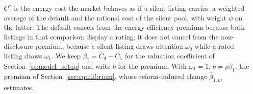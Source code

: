 $C^*$ is the energy cost the market behaves as if a silent listing carries: a weighted average of the default and the rational cost of the silent pool, with weight $\psi$ on the latter. The default cancels from the energy-efficiency premium because both listings in that comparison display a rating; it does not cancel from the non-disclosure premium, because a silent listing draws attention $\omega_0$ while a rated listing draws $\omega_1$. We keep $\beta_1=C_0-C_1$ for the valuation coefficient of Section~\ref{ss:model_setup} and write $b$ for the premium. With $\omega_1=1$, $b=\rho\beta_1$, the premium of Section~\ref{sec:equilibrium}, whose reform-induced change $\hat\beta_{1,m}$ estimates.
